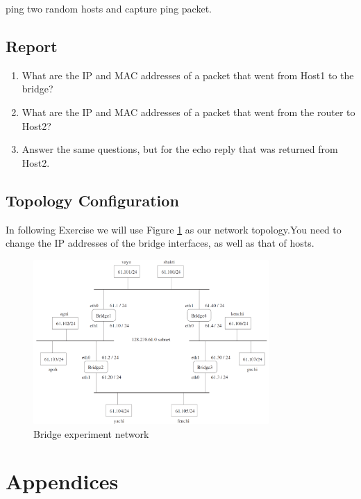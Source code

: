 \documentclass[10pt,a4paper]{article}
\numberwithin{equation}{section}
\numberwithin{figure}{section}
\numberwithin{table}{section}
\begin{document}
    ping two random hosts and capture ping packet.		

    \subsection*{Report}
    \begin{enumerate}
        \item What are the IP and MAC addresses of a packet that went from Host1 to the bridge? 
        \item What are the IP and MAC addresses of a packet that went from the router to Host2?
        \item Answer the same questions, but for the echo reply that was returned from Host2.
    \end{enumerate}

    
    
        
\subsection{Topology Configuration}
   In following Exercise we will use Figure \ref{fig:bridge-ex} as our network topology.You need to change the IP addresses of the bridge interfaces, as well as that of hosts.

\begin{figure}[H]
    \centering
    \includegraphics[width=0.8\textwidth]{img/fig4.png}
    \caption{Bridge experiment network}
    \label{fig:bridge-ex}
\end{figure}


\appendix
\section*{Appendices}
\renewcommand{\thesubsection}{\Alph{subsection}}
\end{document}
